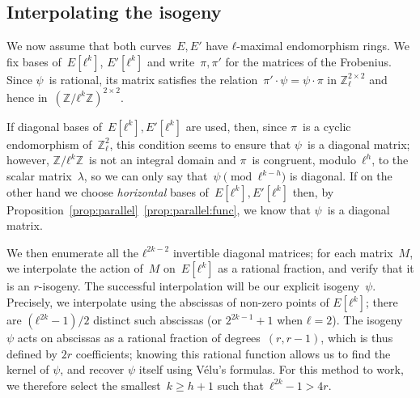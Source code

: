 \documentclass{lms}
\begin{document}
\subsection{Interpolating the isogeny}
\label{sub:final-interp}

We now assume that both curves~$E, E'$
have $ℓ$-maximal endomorphism rings.
We fix bases of~$E[ℓ^k]$, $E'[ℓ^k]$ and write~$π, π'$ for the matrices
of the Frobenius.
Since $ψ$~is rational, its matrix satisfies the relation~$π' · ψ = ψ · π$
in $ℤ_ℓ^{2×2}$ and hence in~$(ℤ/ℓ^k ℤ)^{2 × 2}$.

If diagonal bases of~$E[ℓ^k], E'[ℓ^k]$ are used, then,
since $π$~is a cyclic endomorphism of~$ℤ_ℓ^2$,
this condition seems to ensure that $ψ$~is a diagonal matrix;
however, $ℤ/ℓ^k ℤ$~is not an integral domain
and $π$~is congruent, modulo~$ℓ^h$, to the scalar matrix~$λ$,
so we can only say that~$ψ\pmod{ℓ^{k-h}}$ is diagonal.
If on the other hand we choose \emph{horizontal} bases
of~$E[ℓ^k], E'[ℓ^k]$ then, by Proposition~\ref{prop:parallel}~\ref{prop:parallel:func},
we know that $ψ$~is a diagonal matrix.

We then enumerate all the $ℓ^{2k-2}$ invertible diagonal matrices; for
each matrix~$M$, we interpolate the action of~$M$ on~$E[ℓ^k]$ as a
rational fraction, and verify that it is an $r$-isogeny. The
successful interpolation will be our explicit isogeny~$ψ$.
Precisely, we interpolate using the abscissas of non-zero points of $E[ℓ^k]$;
there are $(ℓ^{2k}-1)/2$ distinct such abscissas (or $2^{2k-1}+1$ when
$ℓ=2$).  The isogeny~$ψ$ acts on abscissas as a rational fraction of
degrees~$(r, r-1)$, which is thus defined by $2r$ coefficients; 
knowing this rational function allows us to find the kernel of $\psi$,
and recover $\psi$ itself using V\'elu's formulas. For this
method to work, we therefore select the smallest~$k ≥ h+1$ such
that~$ℓ^{2k}-1 > 4r$.
\end{document}

